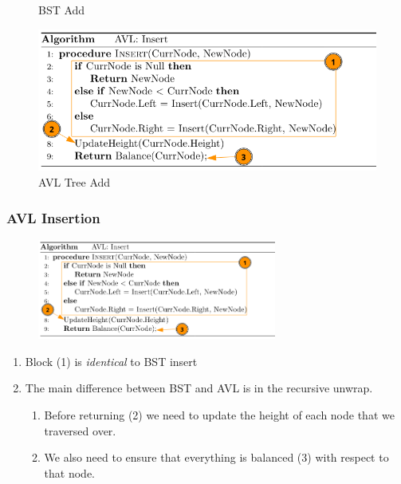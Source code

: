\documentclass{beamer}
\begin{document}
\begin{frame}[fragile]
\begin{minipage}{0.49\textwidth}
\begin{figure}
            \caption{\scriptsize BST Add}
        \end{figure}
    \end{minipage}
    \vline
    \begin{minipage}{0.49\textwidth}
        \centering
        \begin{figure}
            \includegraphics[width=\textwidth]{./imgs/avl-insert-annotate-algo.png}
            \caption{\scriptsize AVL Tree Add}
        \end{figure}
    \end{minipage}
\end{frame}

\begin{frame}[fragile]
    \frametitle{AVL Insertion}
    \begin{figure}
        \includegraphics[width=0.7\textwidth]{./imgs/avl-insert-annotate-algo.png}
    \end{figure}
    \begin{enumerate}
        \item Block (1) is \textit{identical} to BST insert
        \item The main difference between BST and AVL is in the recursive unwrap.
        \begin{enumerate}
            \item Before returning (2) we need to update the height of each node that we traversed over.
            \item We also need to ensure that everything is balanced (3) with respect to that node.
        \end{enumerate}
    \end{enumerate}
\end{frame}
\end{document}
